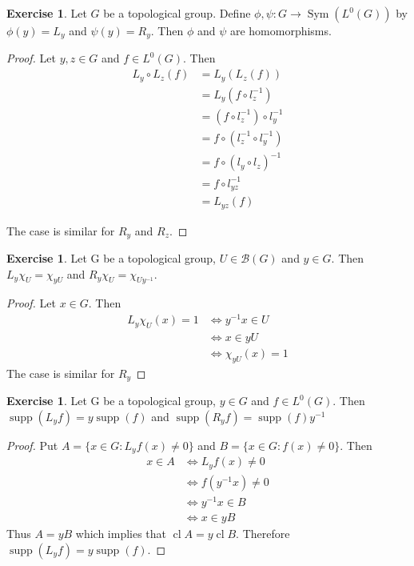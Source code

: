 \documentclass[12pt]{amsart}
\theoremstyle{definition}
\newtheorem{ex}[definition]{Exercise}
\newcommand{\MB}{\mathcal{B}}
\DeclareMathOperator{\supp}{supp}
\DeclareMathOperator{\Sym}{Sym}
\DeclareMathOperator{\cl}{cl}
\newcommand{\lex}[1]{\label{ex:#1}}
\begin{document}
	\begin{ex} \lex{00000} 
	Let $G$ be a topological group. Define $\phi, \psi: G \rightarrow \Sym(L^0(G))$ by $\phi(y) = L_y$ and $\psi(y) = R_y$. Then $\phi$ and $\psi$ are homomorphisms.
	\end{ex}

	\begin{proof}
		Let $y,z \in G$ and $f \in L^0(G)$. Then 
		\begin{align*}
			L_y \circ L_z(f)
			& = L_y (L_z (f))  \\
			& = L_y (f \circ l_z^{-1})  \\
			& = (f \circ l_z^{-1}) \circ l_y^{-1} \\
			&= f \circ (l_z^{-1} \circ l_y^{-1}) \\
			& = f \circ (l_y \circ l_z)^{-1}  \\
			& = f \circ l_{yz}^{-1} \\
			&= L_{yz} (f)
		\end{align*}
		
		The case is similar for $R_y$ and $ R_z$.
	\end{proof}
	
	\begin{ex} \lex{00000} 
		Let G be a topological group, $U \in \MB(G)$ and $y \in G$. Then $L_y\chi_U = \chi_{yU}$ and $R_y\chi_U = \chi_{Uy^{-1}}$. 
	\end{ex}
	
	\begin{proof}
		Let $x \in G$. Then 
		\begin{align*}
			L_y\chi_U(x) = 1
			& \iff y^{-1}x \in U\\
			& \iff x \in yU \\
			& \iff \chi_{yU}(x) = 1
		\end{align*}
		The case is similar for $R_y$
	\end{proof}
	
	\begin{ex} \lex{00000} 
		Let G be a topological group, $y \in G$ and $f \in L^0(G)$. Then $\supp(L_yf) = y\supp(f)$ and $\supp(R_yf) = \supp(f)y^{-1}$
	\end{ex}
	
	\begin{proof}
		Put $A = \{x \in G: L_yf(x) \neq 0 \}$ and $B = \{x \in G: f(x) \neq 0 \}$. Then 
		\begin{align*}
			x \in A
			& \iff L_yf(x) \neq 0 \\
			& \iff f(y^{-1}x) \neq 0 \\
			& \iff y^{-1}x \in B \\
			& \iff x \in yB
		\end{align*}
		Thus $A = yB$ which implies that $\cl A = y \cl B$. Therefore $\supp(L_yf) = y\supp(f)$.
	\end{proof}
	
\end{document}
